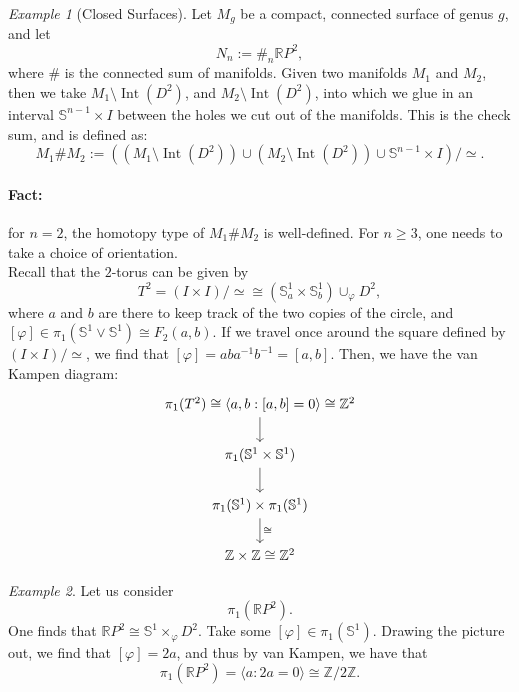 \documentclass[a4paper]{report}
\theoremstyle{definition}
\theoremstyle{remark}
\theoremstyle{proposition}
\theoremstyle{conjecture}
\theoremstyle{lemma}
\theoremstyle{corollary}
\theoremstyle{exercise}
\newtheorem{example}{Example}
\newcommand{\on}{\operatorname}
\begin{document}
\begin{example}[Closed Surfaces]
    Let $M_g$ be a compact, connected surface of genus $g$, and let
    $$N_n := \#_n \mathbb{R}P^2,$$
    where $\#$ is the connected sum of manifolds.
    Given two manifolds $M_1$ and $M_2$, then we take $M_1 \setminus \on{Int}(D^2)$,
    and $M_2 \setminus \on{Int}(D^2)$, into which we glue in an interval 
    $\mathbb{S}^{n-1}\times I$ between the holes we cut out of the manifolds.
    This is the check sum, and is defined as:
    $$M_1 \# M_2 := \left((M_1 \setminus \on{Int}(D^2)) \cup (M_2 \setminus \on{Int}(D^2)) \cup \mathbb{S}^{n-1} \times I\right)/ \simeq.$$
    \paragraph{Fact:} for $n=2$, the homotopy type of $M_1 \# M_2$
    is well-defined. For $n \geq 3$, one needs to take a choice of orientation.\\
    Recall that the $2$-torus can be given by 
    $$T^2 = (I\times I)/\simeq \cong (\mathbb{S}^1_a \times \mathbb{S}^1_b) \cup_\varphi D^2,$$
    where $a$ and $b$ are there to keep track of the two copies of the circle,
    and $[\varphi] \in \pi_1(\mathbb{S}^1 \vee \mathbb{S}^1) \cong F_2(a,b)$.
    If we travel once around the square defined by $(I\times I)/\simeq$, 
    we find that $[\varphi] = aba^{-1}b^{-1} = [a,b]$.
    Then, we have the van Kampen diagram:
    $$\begin{tikzcd}
    {\pi_1(T^2) \cong \langle a,b : [a,b] = 0 \rangle \cong \mathbb{Z}^2} \arrow[d] \\
    \pi_1(\mathbb{S}^1 \times \mathbb{S}^1) \arrow[d]                           \\
    \pi_1(\mathbb{S}^1) \times \pi_1(\mathbb{S}^1) \arrow[d, "\cong"]           \\
    \mathbb{Z} \times \mathbb{Z} \cong \mathbb{Z}^2                            
    \end{tikzcd}$$
\end{example}

\begin{example}
    Let us consider $$\pi_1(\mathbb{R}P^2).$$
    One finds that $\mathbb{R}P^2 \cong \mathbb{S}^1 \times_\varphi D^2$.
    Take some $[\varphi] \in \pi_1(\mathbb{S}^1)$.
    Drawing the picture out, we find that $[\varphi] = 2a$, 
    and thus by van Kampen, we have that
    $$\pi_1(\mathbb{R}P^2) = \langle a : 2a = 0 \rangle \cong \mathbb{Z}/2\mathbb{Z}.$$
\end{example}
\end{document}
